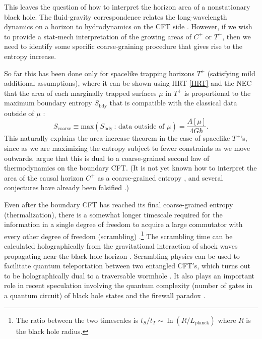 \documentclass[12pt,a4paper]{article}
\def\be{\begin{equation}}
\def\ee{\end{equation}}
\begin{document}
This leaves the question of how to interpret the horizon area of a nonstationary black hole.  The fluid-gravity correspondence relates the long-wavelength dynamics on a horizon to hydrodynamics on the CFT side \cite{Hubeny:2011hd}.  However, if we wish to provide a stat-mech interpretation of the growing areas of $C^+$ or $T^+$, then we need to identify some specific coarse-graining procedure that gives rise to the entropy increase.

So far this has been done only for spacelike trapping horizons $T^+$ (satisfying mild additional assumptions), where it can be shown using HRT \eqref{HRT} and the NEC that the area of each marginally trapped surfaces $\mu$ in $T^+$ is proportional to the maximum boundary entropy $S_\text{bdy}$ that is compatible with the classical data outside of $\mu$ \cite{Engelhardt:2017aux,Engelhardt4th}:
\be
S_\text{coarse} \equiv \text{max}(S_\text{bdy} \,:\, \text{data outside of }\mu) = \frac{A[\mu]}{4G\hbar}.
\ee
This naturally explains the area-increase theorem in the case of spacelike $T^+$'s, since as we are maximizing the entropy subject to fewer constraints as we move outwards.  \cite{Engelhardt:2017aux,Engelhardt4th} argue that this is dual to a coarse-grained second law of thermodynamics on the boundary CFT.  (It is not yet known how to interpret the area of the causal horizon $C^+$ as a coarse-grained entropy \cite{Hubeny:2012wa,Kelly:2013aja}, and several conjectures \cite{Freivogel:2013zta,Kelly:2013aja} have already been falsified \cite{Engelhardt:2017wgc}.)

Even after the boundary CFT has reached its final coarse-grained entropy (thermalization), there is a somewhat longer timescale required for the information in a single degree of freedom to acquire a large commutator with every other degree of freedom (scrambling) \cite{Hayden:2007cs,Sekino:2008he}.\footnote{The ratio between the two timescales is $t_S / t_T \sim \ln(R/L_{\text{planck}})$ where $R$ is the black hole radius.}  The scrambling time can be calculated holographically from the gravitational interaction of shock waves propagating near the black hole horizon \cite{Shenker:2013pqa}.  Scrambling physics can be used to facilitate quantum teleportation between two entangled CFT's, which turns out to be holographically dual to a traversable wormhole \cite{Gao:2016bin,Maldacena:2017axo,Susskind:2017nto}.  It also plays an important role in recent speculation involving the quantum complexity (number of gates in a quantum circuit) of black hole states \cite{Stanford:2014jda,Brown:2015bva} and the firewall paradox \cite{Almheiri:2012rt,Almheiri:2013hfa}.  
\end{document}
